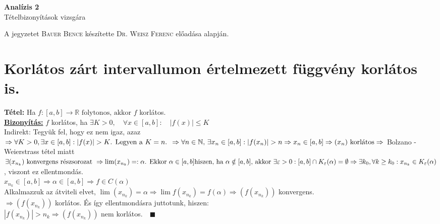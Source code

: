 \documentclass[a4paper,11pt]{article}
\begin{document}
	\def\R{\mathbb{R}}
	\def\N{\mathbb{N}}
	\def\sume{\displaystyle\sum_{n=1}^{\infty}}
	\def\sumn{\displaystyle\sum_{n=0}^{\infty}}
	\def\sumeu{\displaystyle\sum_{n=1}}
	\def\sumun{\displaystyle\sum_{n=0}}
	\def\cab{\in C[a,b]}
	\def\dab{\in\D(a,b)}
	\def\biz{\normalsize{\textbf{\underline{Bizonyítás:} }\hspace*{0.5cm}}}
	\def\tetel{\normalsize \textbf{Tétel: }}
	\def\limn{\displaystyle\lim_{n\to +\infty}}
	\def\limh{\displaystyle\lim_{h\to0}}
	\def\limxa{\displaystyle\lim_{x\to a}}
	\def\limxatelj{\displaystyle\lim_{x\to a}\frac{f(x)-f(a)}{x-a}}
	\def\rtr{\displaystyle\R\to\R}
	\def\D{\displaystyle\mathcal{D}}
	\def\lima{\displaystyle\lim_{a}}
	\def\bizva{\quad\blacksquare}
	\def\fda{f\in\D(a)}
	\def\limaj{\displaystyle\lim_{a+0}}
	\def\limnj{\displaystyle\lim_{0+0}}
	\def\Rv{\overline{\mathbb{R}}}
	\def\fabr{f:(a,b)\to\R}
	\def\itr{I\to\R}
	\def\prfv{primitív függvény}
	\def\rab{R[a,b]}
	\def\te{\tau_1}
	\def\tk{\tau_2}
	\def\ftau{(f,\tau)}
	\def\kab{K[a,b]}
	\def\fab{F[a,b]}
	\def\sumi{\sum\limits_{i=1}^{n}}
	\def\intv{[x_{i-1},x_i]}
	\def\intab{\int\limits_{a}^{b}}	
\begin{center}
	{\LARGE \textbf{Analízis 2}}\\[0.2cm]
	{\large Tételbizonyítások vizsgára}
\end{center}
{\small A jegyzetet \textsc{Bauer Bence} készítette \textsc{Dr. Weisz Ferenc} előadása alapján.}
\section{Korlátos zárt intervallumon értelmezett függvény korlátos is.}
\tetel Ha $f:[a,b]\to\R \text{ folytonos, akkor } f $ korlátos. \\[0.1cm]	
\biz $f$ korlátos, ha $\exists K>0, \quad \forall x \in [a,b]: \quad |f(x)|\leq K$ \\[0.1cm]
Indirekt: Tegyük fel, hogy ez nem igaz, azaz\\[0.2cm]	
$\Rightarrow \forall K>0,\exists x \in[a,b]:|f(x)|> K\text{. Legyen a }K=n\text{. } 
\Rightarrow\forall n\in\N\text{, }\exists x_n\in[a,b]:|f(x_n)|>n\\[0.1cm] 
\Rightarrow x_n\in[a,b]\Rightarrow(x_n)\text{ korlátos}\Rightarrow$ Bolzano -
Weierstrass tétel miatt \\[0.1cm] $\exists(x_{n_k})\text{ konvergens részsorozat }
\Rightarrow\lim(x_{n_k})=:\alpha\text{. Ekkor }\alpha\in[a,b]\\[0.1cm]
\text{hiszen, ha }\alpha\notin[a,b]\text{, akkor }\exists\varepsilon>0:[a,b]\cap
K_\varepsilon(\alpha)=\emptyset\\[0.1cm]\Rightarrow\exists k_0,\forall k\geq k_0:
x_{n_k}\in K_\varepsilon(\alpha)$, viszont ez ellentmondás. \\[0.1cm]$x_{n_k}\in
[a,b]\Rightarrow\alpha\in[a,b]\Rightarrow f\in C(\alpha)$\\[0.1cm] Alkalmazzuk az
átviteli elvet, $\lim(x_{n_k})=\alpha\Rightarrow\lim f(x_{n_k})=f(\alpha)
\Rightarrow(f (x_{n_k}))$ konvergens. \\[0.1cm] $\Rightarrow(f (x_{n_k}))$
korlátos. És így ellentmondásra juttotunk, hiszen: \\[0.1cm] $|f(x_{n_k})|>n_k
\Rightarrow(f (x_{n_k}))$ nem korlátos.$\bizva$
\end{document}
